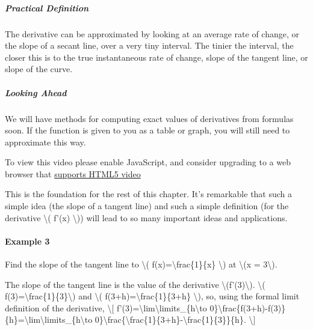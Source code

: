 \hypertarget{practical-definition}{%
\subparagraph{Practical Definition}\label{practical-definition}}

The derivative can be approximated by looking at an average rate of
change, or the slope of a secant line, over a very tiny interval. The
tinier the interval, the closer this is to the true instantaneous rate
of change, slope of the tangent line, or slope of the curve.

\hypertarget{looking-ahead}{%
\subparagraph{Looking Ahead}\label{looking-ahead}}

We will have methods for computing exact values of derivatives from
formulas soon. If the function is given to you as a table or graph, you
will still need to approximate this way.

To view this video please enable JavaScript, and consider upgrading to a
web browser that \href{http://videojs.com/html5-video-support/}{supports
HTML5 video}

This is the foundation for the rest of this chapter. It's remarkable
that such a simple idea (the slope of a tangent line) and such a simple
definition (for the derivative \textbackslash{}( f'(x)
\textbackslash{})) will lead to so many important ideas and
applications.

\hypertarget{example-3}{%
\paragraph{Example 3}\label{example-3}}

Find the slope of the tangent line to \textbackslash{}(
f(x)=\textbackslash{}frac\{1\}\{x\} \textbackslash{}) at
\textbackslash{}(x = 3\textbackslash{}).

The slope of the tangent line is the value of the derivative
\textbackslash{}(f'(3)\textbackslash{}). \textbackslash{}(
f(3)=\textbackslash{}frac\{1\}\{3\}\textbackslash{}) and
\textbackslash{}( f(3+h)=\textbackslash{}frac\{1\}\{3+h\}
\textbackslash{}), so, using the formal limit definition of the
derivative, \textbackslash{}{[}
f'(3)=\textbackslash{}lim\textbackslash{}limits\_\{h\textbackslash{}to
0\}\textbackslash{}frac\{f(3+h)-f(3)\}\{h\}=\textbackslash{}lim\textbackslash{}limits\_\{h\textbackslash{}to
0\}\textbackslash{}frac\{\textbackslash{}frac\{1\}\{3+h\}-\textbackslash{}frac\{1\}\{3\}\}\{h\}.
\textbackslash{}{]}

